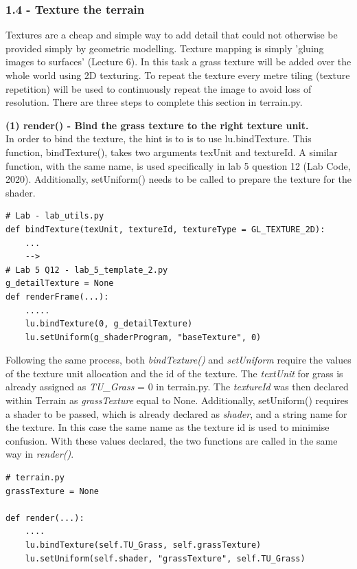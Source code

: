 \documentclass[a4 paper, 12pt]{article}
\begin{document}
\subsubsection{1.4 - Texture the terrain}
Textures are a cheap and simple way to add detail that could not otherwise be provided simply by geometric modelling. Texture mapping is simply 'gluing images to surfaces' (Lecture 6). In this task a grass texture will be added over the whole world using 2D texturing. To repeat the texture every metre tiling (texture repetition) will be used to continuously repeat the image to avoid loss of resolution. There are three steps to complete this section in terrain.py. 

\textbf{(1) render() - Bind the grass texture to the right texture unit.} \\ 
In order to bind the texture, the hint is to is to use lu.bindTexture. This function, bindTexture(), takes two arguments texUnit and textureId. A similar function, with the same name, is used specifically in lab 5 question 12 (Lab Code, 2020). Additionally, setUniform() needs to be called to prepare the texture for the shader. 
    \begin{lstlisting}
# Lab - lab_utils.py 
def bindTexture(texUnit, textureId, textureType = GL_TEXTURE_2D):
    ...
    -->
# Lab 5 Q12 - lab_5_template_2.py
g_detailTexture = None
def renderFrame(...):
    .....
    lu.bindTexture(0, g_detailTexture)
    lu.setUniform(g_shaderProgram, "baseTexture", 0)
    \end{lstlisting}

Following the same process, both \textit{bindTexture()} and \textit{setUniform} require the values of the texture unit allocation and the id of the texture. The \textit{textUnit} for grass is already assigned as \textit{TU\_Grass} = 0 in terrain.py. The \textit{textureId} was then declared within Terrain as \textit{grassTexture} equal to None. Additionally, setUniform() requires a shader to be passed, which is already declared as \textit{shader}, and a string name for the texture. In this case the same name as the texture id is used to minimise confusion. With these values declared, the two functions are called in the same way in \textit{render()}.
    \begin{lstlisting} 
# terrain.py
grassTexture = None

def render(...):
    ....
    lu.bindTexture(self.TU_Grass, self.grassTexture)
    lu.setUniform(self.shader, "grassTexture", self.TU_Grass)        
    \end{lstlisting}
\end{document}
